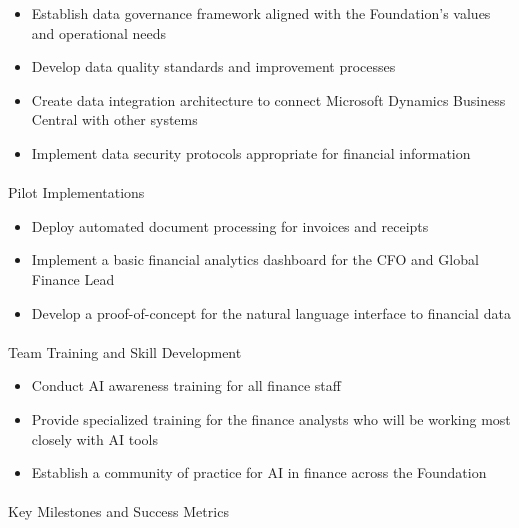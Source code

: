\documentclass[
]{article}
\makeatletter
\let\oldparagraph\paragraph
\renewcommand{\paragraph}{
    \@ifstar
      \xxxParagraphStar
      \xxxParagraphNoStar
  }
\newcommand{\xxxParagraphStar}[1]{\oldparagraph*{#1}\mbox{}}
\newcommand{\xxxParagraphNoStar}[1]{\oldparagraph{#1}\mbox{}}
\providecommand{\tightlist}{%
  \setlength{\itemsep}{0pt}\setlength{\parskip}{0pt}}\usepackage{longtable,booktabs,array}
\makeatother
\begin{document}
\begin{itemize}
\tightlist
\item
  Establish data governance framework aligned with the Foundation's
  values and operational needs
\item
  Develop data quality standards and improvement processes
\item
  Create data integration architecture to connect Microsoft Dynamics
  Business Central with other systems
\item
  Implement data security protocols appropriate for financial
  information
\end{itemize}

\paragraph{Pilot Implementations}\label{pilot-implementations}

\begin{itemize}
\tightlist
\item
  Deploy automated document processing for invoices and receipts
\item
  Implement a basic financial analytics dashboard for the CFO and Global
  Finance Lead
\item
  Develop a proof-of-concept for the natural language interface to
  financial data
\end{itemize}

\paragraph{Team Training and Skill
Development}\label{team-training-and-skill-development}

\begin{itemize}
\tightlist
\item
  Conduct AI awareness training for all finance staff
\item
  Provide specialized training for the finance analysts who will be
  working most closely with AI tools
\item
  Establish a community of practice for AI in finance across the
  Foundation
\end{itemize}

\paragraph{Key Milestones and Success
Metrics}\label{key-milestones-and-success-metrics}
\end{document}
